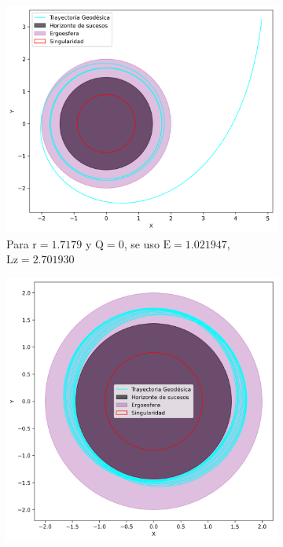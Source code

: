 \begin{figure}[H]
    \centering
    \begin{subfigure}{0.5\textwidth}
        \includegraphics[width=\linewidth]{AgujerosNegros/kerr/geodesics_plots/geodesica_circular_r1,71_Q0_planoxy.png}
        \caption{Para $\mathrm{r}=1.7179$ y $\mathrm{Q}=0$, se uso $\mathrm{E}=1.021947$, $\mathrm{Lz}=2.701930$}
    \end{subfigure}
    \begin{subfigure}{0.5\textwidth}
        \includegraphics[width=\linewidth]{AgujerosNegros/kerr/geodesics_plots/geodesica_circular_r1,71_Q5_planoxy.png}

\end{subfigure}
\end{figure}
